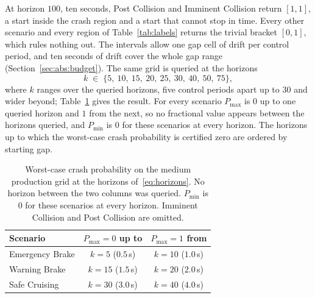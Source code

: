 \documentclass[11pt,a4paper]{article}
\theoremstyle{plain}
\theoremstyle{remark}
\begin{document}
	At horizon $100$, ten seconds, Post Collision and Imminent Collision return $[1, 1]$, a start inside the crash region and a start that cannot stop in time. Every other scenario and every region of Table~\ref{tab:labels} returns the trivial bracket $[0, 1]$, which rules nothing out. The intervals allow one gap cell of drift per control period, and ten seconds of drift cover the whole gap range (Section~\ref{sec:abs:budget}). The same grid is queried at the horizons
	\begin{equation}
		k \;\in\; \{5,\ 10,\ 15,\ 20,\ 25,\ 30,\ 40,\ 50,\ 75\},
		\label{eq:horizons}
	\end{equation}
	where $k$ ranges over the queried horizons, five control periods apart up to $30$ and wider beyond; Table~\ref{tab:frontier} gives the result. For every scenario $P_{\max}$ is $0$ up to one queried horizon and $1$ from the next, so no fractional value appears between the horizons queried, and $P_{\min}$ is $0$ for these scenarios at every horizon. The horizons up to which the worst-case crash probability is certified zero are ordered by starting gap.
	
	\begin{table}[H]
		\centering
		\begin{tabular}{lcc}
			\toprule
			Scenario & $P_{\max} = 0$ up to & $P_{\max} = 1$ from \\
			\midrule
			Emergency Brake & $k = 5$ ($0.5$\,s) & $k = 10$ ($1.0$\,s) \\
			Warning Brake & $k = 15$ ($1.5$\,s) & $k = 20$ ($2.0$\,s) \\
			Safe Cruising & $k = 30$ ($3.0$\,s) & $k = 40$ ($4.0$\,s) \\
			\bottomrule
		\end{tabular}
		\caption{Worst-case crash probability on the medium production grid at the horizons of~\eqref{eq:horizons}. No horizon between the two columns was queried. $P_{\min}$ is $0$ for these scenarios at every horizon. Imminent Collision and Post Collision are omitted.}
		\label{tab:frontier}
	\end{table}
	
\end{document}
